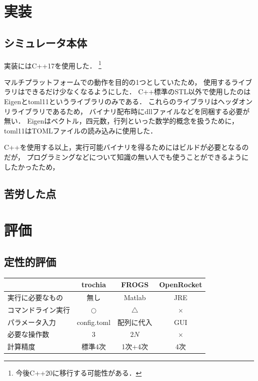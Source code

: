 \documentclass[a4j,10pt]{jsarticle}
\begin{document}
\section{実装}

\subsection{シミュレータ本体}

実装にはC++17を使用した．
\footnote{今後C++20に移行する可能性がある．}

マルチプラットフォームでの動作を目的の1つとしていたため，
使用するライブラリはできるだけ少なくなるようにした．
C++標準のSTL以外で使用したのはEigenとtoml11というライブラリのみである．
これらのライブラリはヘッダオンリライブラリであるため，
バイナリ配布時にdllファイルなどを同梱する必要が無い．
Eigenはベクトル，四元数，行列といった数学的概念を扱うために，
toml11はTOMLファイルの読み込みに使用した．


C++を使用する以上，実行可能バイナリを得るためにはビルドが必要となるのだが，
プログラミングなどについて知識の無い人でも使うことができるようにしたかったため，


\subsection{苦労した点}


\section{評価}
\subsection{定性的評価}

\begin{table}[htb]
  \begin{tabular}{|l|c|c|c|} \hline
         & trochia & FROGS & OpenRocket \\ \hline
	実行に必要なもの & 無し & Matlab & JRE \\
    コマンドライン実行 & $\bigcirc$ & $\bigtriangleup$ & $\times$ \\
    パラメータ入力 & config.toml & 配列に代入 & GUI \\
	必要な操作数 & $3$ & $2N$ & $\times$ \\
	計算精度 & 標準4次 & 1次+4次 & 4次 \\ \hline
  \end{tabular}
\end{table}
\end{document}
